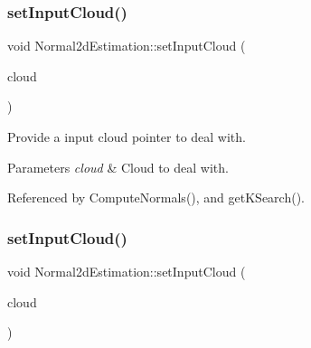 \mbox{\label{classNormal2dEstimation_a8cd86c1bddf1eb5bc7cb11f0a12810f8}} 
\subsubsection{\texorpdfstring{set\+Input\+Cloud()}{setInputCloud()}\hspace{0.1cm}{\footnotesize\ttfamily [1/2]}}
{\footnotesize\ttfamily void Normal2d\+Estimation\+::set\+Input\+Cloud (\begin{DoxyParamCaption}\item[{const \hyperlink{Normal2dEstimation_8h_a389a43addc496dc19a5bb0575cc60bc4}{Const\+Ptr\+Cloud} \&}]{cloud }\end{DoxyParamCaption})}



Provide a input cloud pointer to deal with. 


\begin{DoxyParams}{Parameters}
{\em cloud} & Cloud to deal with. \\
\hline
\end{DoxyParams}


Referenced by Compute\+Normals(), and get\+K\+Search().

\mbox{\label{classNormal2dEstimation_a8cd86c1bddf1eb5bc7cb11f0a12810f8}} 
\subsubsection{\texorpdfstring{set\+Input\+Cloud()}{setInputCloud()}\hspace{0.1cm}{\footnotesize\ttfamily [2/2]}}
{\footnotesize\ttfamily void Normal2d\+Estimation\+::set\+Input\+Cloud (\begin{DoxyParamCaption}\item[{const \hyperlink{Normal2dEstimation_8h_a389a43addc496dc19a5bb0575cc60bc4}{Const\+Ptr\+Cloud} \&}]{cloud }\end{DoxyParamCaption})\hspace{0.3cm}{\ttfamily [inline]}}

